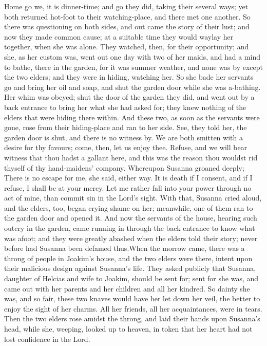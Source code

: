{{Home go we, it is dinner-time; and go they did, taking their several ways;
yet both returned hot-foot to their watching-place, and there met one another. So there was questioning on both sides, and out came the story of their lust; and now they made common cause; at a suitable time they would waylay her together, when she was alone.
They watched, then, for their opportunity; and she, as her custom was, went out one day with two of her maids, and had a mind to bathe, there in the garden, for it was summer weather,
and none was by except the two elders; and they were in hiding, watching her.
So she bade her servants go and bring her oil and soap, and shut the garden door while she was a-bathing.
Her whim was obeyed; shut the door of the garden they did, and went out by a back entrance to bring her what she had asked for; they knew nothing of the elders that were hiding there within.
And these two, as soon as the servants were gone, rose from their hiding-place and ran to her side.
See, they told her, the garden door is shut, and there is no witness by. We are both smitten with a desire for thy favours; come, then, let us enjoy thee.
Refuse, and we will bear witness that thou hadst a gallant here, and this was the reason thou wouldst rid thyself of thy hand-maidens’ company.
Whereupon Susanna groaned deeply; There is no escape for me, she said, either way. It is death if I consent, and if I refuse, I shall be at your mercy.
Let me rather fall into your power through no act of mine, than commit sin in the Lord’s sight.
With that, Susanna cried aloud, and the elders, too, began crying shame on her;
meanwhile, one of them ran to the garden door and opened it.
And now the servants of the house, hearing such outcry in the garden, came running in through the back entrance to know what was afoot;
and they were greatly abashed when the elders told their story; never before had Susanna been defamed thus.When the morrow came,
there was a throng of people in Joakim’s house, and the two elders were there, intent upon their malicious design against Susanna’s life.
They asked publicly that Susanna, daughter of Helcias and wife to Joakim, should be sent for; sent for she was,
and came out with her parents and her children and all her kindred.
So dainty she was, and so fair,
these two knaves would have her let down her veil, the better to enjoy the sight of her charms.
All her friends, all her acquaintances, were in tears.
Then the two elders rose amidst the throng, and laid their hands upon Susanna’s head,
while she, weeping, looked up to heaven, in token that her heart had not lost confidence in the Lord.
}}
